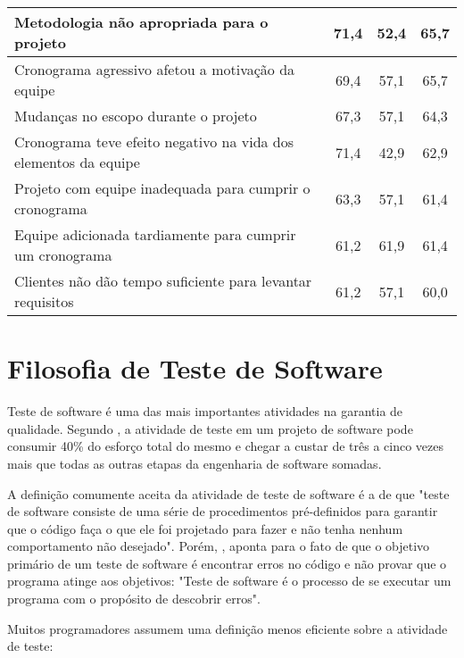 \begin{table}[ht]
\begin{tabular}{lccc}
Metodologia não apropriada para o projeto & 71,4 & 52,4 & 65,7\tabularnewline

\hline

Cronograma agressivo afetou a motivação da equipe & 69,4 & 57,1 & 65,7\tabularnewline

\hline

Mudanças no escopo durante o projeto & 67,3 & 57,1 & 64,3\tabularnewline

\hline

Cronograma teve efeito negativo na vida dos elementos da equipe & 71,4 & 42,9 & 62,9\tabularnewline

\hline

Projeto com equipe inadequada para cumprir o cronograma & 63,3 & 57,1 & 61,4\tabularnewline

\hline

Equipe adicionada tardiamente para cumprir um cronograma & 61,2 & 61,9 & 61,4\tabularnewline

\hline

Clientes não dão tempo suficiente para levantar requisitos & 61,2 & 57,1 & 60,0\tabularnewline

\hline

\end{tabular}
\end{table}

\section{Filosofia de Teste de Software}

Teste de software é uma das mais importantes atividades na garantia de qualidade. Segundo , a atividade de teste em um projeto de software pode consumir 40\% do esforço total do mesmo e chegar a custar de três a cinco vezes mais que todas as outras etapas da engenharia de software somadas.

A definição comumente aceita da atividade de teste de software é a de que "teste de software consiste de uma série de procedimentos pré-definidos para garantir que o código faça o que ele foi projetado para fazer e não tenha nenhum comportamento não desejado". Porém, , aponta para o fato de que o objetivo primário de um teste de software é encontrar erros no código e não provar que o programa atinge aos objetivos: "Teste de software é o processo de se executar um programa com o propósito de descobrir erros". 

Muitos programadores assumem uma definição menos eficiente sobre a atividade de teste:

